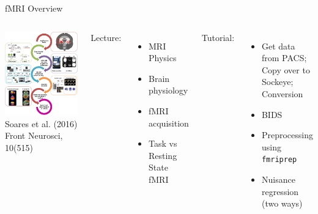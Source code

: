 \documentclass[aspectratio=169,xcolor=dvipsnames]{beamer}
\begin{document}

\begin{frame}{fMRI Overview}
\begin{columns}[c]
\includegraphics[width=1\textwidth]{imgs/fmri_overview}
\tiny{Soares et al. (2016) Front Neurosci, 10(515)}

Lecture:
\begin{itemize}
\item MRI Physics
\item Brain physiology
\item fMRI acquisition
\item Task vs Resting State fMRI
\end{itemize}

Tutorial:
\begin{itemize}
\item Get data from PACS; Copy over to Sockeye; Conversion
\item BIDS
\item Preprocessing using \texttt{fmriprep}
\item Nuisance regression (two ways)
\end{itemize}
\end{columns}

\end{frame}
\end{document}
